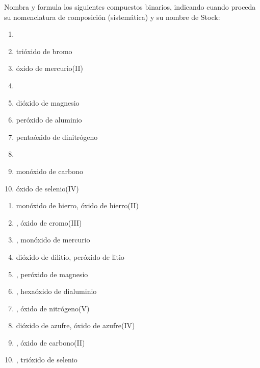 \begin{exercise}[
    tags    = {inorgánica,compuestos binarios,óxidos,peróxidos},
    topics  = {química inorgánica,formulación,nomenclatura},
    source  = {SAN Formulación, p27, e31},
  ]
  Nombra y formula los siguientes compuestos binarios, indicando cuando proceda su nomenclatura de composición (sistemática) y su nombre de Stock:

  \begin{enumerate}
    \item {}
    \item trióxido de bromo
    \item óxido de mercurio(II)
    \item {}
    \item dióxido de magnesio
    \item peróxido de aluminio
    \item pentaóxido de dinitrógeno
    \item {}
    \item monóxido de carbono
    \item óxido de selenio(IV)
  \end{enumerate}
\end{exercise}

\begin{solution}
  \begin{enumerate}
    \item monóxido de hierro, óxido de hierro(II)
    \item {}, óxido de cromo(III)
    \item {}, monóxido de mercurio
    \item dióxido de dilitio, peróxido de litio
    \item {}, peróxido de magnesio
    \item {}, hexaóxido de dialuminio
    \item {}, óxido de nitrógeno(V)
    \item dióxido de azufre, óxido de azufre(IV)
    \item {}, óxido de carbono(II)
    \item {}, trióxido de selenio
  \end{enumerate}
\end{solution}




